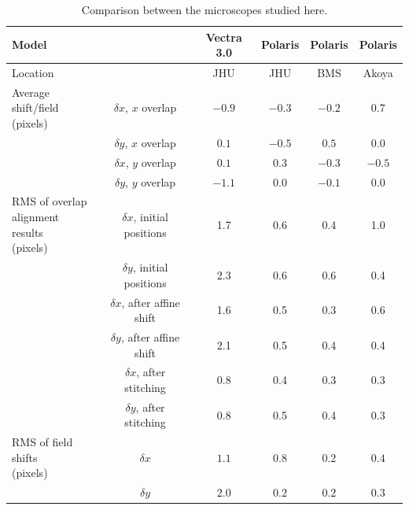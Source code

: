 \documentclass{article}
\begin{document}
\begin{table}[ht]
	\centering
	\begin{tabular}{|l|c|c|c|c|c|}
	\hline
	\multicolumn{2}{|l|}{Model} & Vectra 3.0 & Polaris & Polaris & Polaris \\\hline
	\multicolumn{2}{|l|}{Location} & JHU & JHU & BMS & Akoya \\\hline
	\multirowcell{3}[0pt][l]{Average shift/field \\ (pixels)}
	& $\delta x$, $x$ overlap & $-0.9$ & $-0.3$ & $-0.2$ & $0.7$ \\\cline{2-6}
	& $\delta y$, $x$ overlap & $0.1$ & $-0.5$ & $0.5$ & $0.0$ \\\cline{2-6}
	& $\delta x$, $y$ overlap & $0.1$ & $0.3$ & $-0.3$ & $-0.5$ \\\cline{2-6}
	& $\delta y$, $y$ overlap & $-1.1$ & $0.0$ & $-0.1$ & $0.0$ \\\hline
	\multirowcell{6}[0pt][l]{RMS of overlap\\alignment results\\(pixels)}
        & $\delta x$, initial positions & 1.7 & 0.6 & 0.4 & 1.0 \\\cline{2-6}
        & $\delta y$, initial positions & 2.3 & 0.6 & 0.6 & 0.4 \\\cline{2-6}
        & $\delta x$, after affine shift & 1.6 & 0.5 & 0.3 & 0.6 \\\cline{2-6}
        & $\delta y$, after affine shift & 2.1 & 0.5 & 0.4 & 0.4 \\\cline{2-6}
        & $\delta x$, after stitching & 0.8 & 0.4 & 0.3 & 0.3 \\\cline{2-6}
        & $\delta y$, after stitching & 0.8 & 0.5 & 0.4 & 0.3 \\\hline
	\multirowcell{2}[0pt][l]{RMS of field shifts\\(pixels)}
	& $\delta x$ & $1.1$ & $0.8$ & $0.2$ & $0.4$ \\\cline{2-6}
	& $\delta y$ & $2.0$ & $0.2$ & $0.2$ & $0.3$ \\\hline
	\end{tabular}
	\caption{Comparison between the microscopes studied here.}
	\label{table:microscopes}
\end{table}
\end{document}
